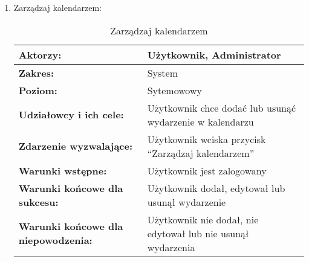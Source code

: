 \begin{enumerate}[label=(\Roman*)]
	\item Zarządzaj kalendarzem:
	\begin{table}[H]
\centering
\caption{Zarządzaj kalendarzem}
\label{zarzadzajkalendarzem}
\begin{tabular}{|p{7cm}|p{7cm}|}
  \hline 
  \textbf{Aktorzy:} & Użytkownik, Administrator\\
  \hline
  \textbf{Zakres:} & System \\
	\hline
  \textbf{Poziom:} & Sytemowowy \\
	\hline
  \textbf{Udziałowcy i ich cele: } & Użytkownik chce dodać lub usunąć wydarzenie w kalendarzu \\
	\hline
  \textbf{Zdarzenie wyzwalające: } & Użytkownik wciska przycisk “Zarządzaj kalendarzem” \\
	\hline
  \textbf{Warunki wstępne: } & Użytkownik jest zalogowany
 \\
	\hline
  \textbf{Warunki końcowe dla sukcesu:} & Użytkownik dodał, edytował lub usunął wydarzenie
 \\
	\hline
  \textbf{Warunki końcowe dla niepowodzenia:} & Użytkownik nie dodał, nie edytował lub nie usunął wydarzenia \\
  \hline
\end{tabular} 
\end{table}


\end{enumerate}

